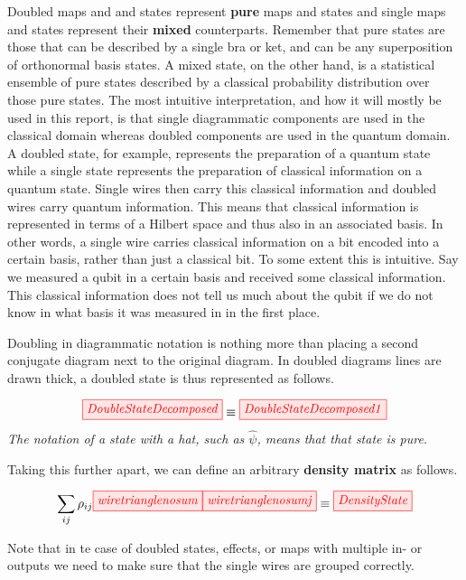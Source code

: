 \documentclass[]{article}
\begin{document}
Doubled maps and and states represent \textbf{pure} maps and states and single maps and states represent their \textbf{mixed} counterparts. Remember that pure states are those that can be described by a single bra or ket, and can be any superposition of orthonormal basis states. A mixed state, on the other hand, is a statistical ensemble of pure states described by a classical probability distribution over those pure states. The most intuitive interpretation, and how it will mostly be used in this report, is that single diagrammatic components are used in the classical domain whereas doubled components are used in the quantum domain. A doubled state, for example, represents the preparation of a quantum state while a single state represents the preparation of classical information on a quantum state. Single wires then carry this classical information and doubled wires carry quantum information. This means that classical information is represented in terms of a Hilbert space and thus also in an associated basis. In other words, a single wire carries classical information on a bit encoded into a certain basis, rather than just a classical bit. To some extent this is intuitive. Say we measured a qubit in a certain basis and received some classical information. This classical information does not tell us much about the qubit if we do not know in what basis it was measured in in the first place.

Doubling in diagrammatic notation is nothing more than placing a second conjugate diagram
next to the original diagram. In doubled diagrams lines are drawn thick, a doubled state is thus
represented as follows.

\begin{equation}
	\label{equation:doubledstate}
	\tikzfig{DoubleStateDecomposed} \equiv \tikzfig{DoubleStateDecomposed1}
\end{equation}
\textit{The notation of a state with a hat, such as $\hat{\psi}$, means that that state is pure.}

Taking this further apart, we can define an arbitrary \textbf{density matrix} as follows.

\begin{equation}
	\label{equation:densitymatrix}
	 \sum\limits_{ij} \rho_{ij} \tikzfig{wiretrianglenosum} \tikzfig{wiretrianglenosumj} \equiv \tikzfig{DensityState}
\end{equation}

Note that in te case of doubled states, effects, or maps with multiple in- or outputs we need to make sure that the single wires are grouped correctly.
\end{document}
